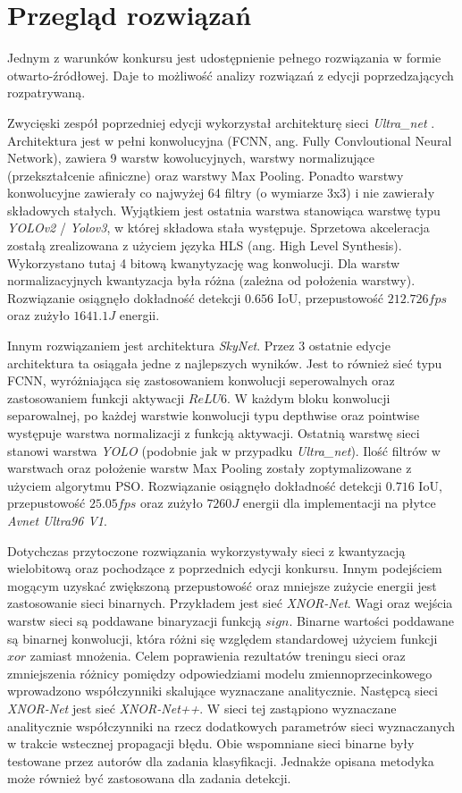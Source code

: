 \section{Przegląd rozwiązań}
Jednym z warunków konkursu jest udostępnienie pełnego rozwiązania w formie otwarto-źródłowej. 
Daje to możliwość analizy rozwiązań z edycji poprzedzających rozpatrywaną.

Zwycięski zespół poprzedniej edycji wykorzystał architekturę sieci \emph{Ultra\_net} \cite{ultra_net}. 
Architektura jest w pełni konwolucyjna (FCNN, ang. Fully Convloutional Neural Network), zawiera 9 warstw kowolucyjnych, warstwy normalizujące (przekształcenie afiniczne) oraz warstwy Max Pooling. 
Ponadto warstwy konwolucyjne zawierały co najwyżej 64 filtry (o wymiarze 3x3) i nie zawierały składowych stałych. Wyjątkiem jest ostatnia warstwa  stanowiąca warstwę typu \emph{YOLOv2}\cite{yolov2} / \emph{Yolov3}\cite{yolov3}, w której składowa stała występuje.
Sprzetowa akceleracja zostałą zrealizowana z użyciem języka HLS (ang. High Level Synthesis). 
Wykorzystano tutaj 4 bitową kwanytyzację wag konwolucji. 
Dla warstw normalizacyjnych kwantyzacja była różna (zależna od położenia warstwy).
Rozwiązanie osiągnęło dokładność detekcji $0.656$ IoU, przepustowość $212.726 fps$ oraz zużyło $1641.1 J$ energii. 

Innym rozwiązaniem jest architektura \emph{SkyNet}\cite{skynet}. 
Przez 3 ostatnie edycje architektura ta osiągała jedne z najlepszych wyników.
Jest to również sieć typu FCNN, wyróżniająca się zastosowaniem konwolucji seperowalnych oraz zastosowaniem funkcji aktywacji $ReLU6$.
W każdym bloku konwolucji separowalnej, po każdej warstwie konwolucji typu depthwise oraz pointwise  występuje warstwa normalizacji z funkcją aktywacji.
Ostatnią warstwę sieci stanowi warstwa \emph{YOLO} (podobnie jak w przypadku \emph{Ultra\_net}).
Ilość filtrów w warstwach oraz położenie warstw Max Pooling zostały zoptymalizowane z użyciem algorytmu PSO.
Rozwiązanie osiągnęło dokładność detekcji $0.716$ IoU, przepustowość $25.05 fps$ oraz zużyło $7260 J$ energii dla implementacji na płytce \emph{Avnet Ultra96 V1}. 

Dotychczas przytoczone rozwiązania wykorzystywały sieci z kwantyzacją wielobitową oraz pochodzące z poprzednich edycji konkursu. Innym podejściem mogącym uzyskać zwiększoną przepustowość oraz mniejsze zużycie energii jest zastosowanie sieci binarnych. Przykładem jest sieć \emph{XNOR-Net}\cite{xnor_net}. Wagi oraz wejścia warstw sieci są poddawane binaryzacji funkcją $sign$. 
Binarne wartości poddawane są binarnej konwolucji, która różni się względem standardowej użyciem funkcji $xor$ zamiast mnożenia. 
Celem poprawienia rezultatów treningu sieci oraz zmniejszenia różnicy pomiędzy odpowiedziami modelu zmiennoprzecinkowego wprowadzono współczynniki skalujące wyznaczane analitycznie. 
Następcą sieci \emph{XNOR-Net} jest sieć \emph{XNOR-Net++}\cite{xnor_net++}. W sieci tej zastąpiono wyznaczane analitycznie współczynniki na rzecz dodatkowych parametrów sieci wyznaczanych w trakcie wstecznej propagacji błędu.
Obie wspomniane sieci binarne były testowane przez autorów dla zadania klasyfikacji. 
Jednakże opisana metodyka może również być zastosowana dla zadania detekcji.


